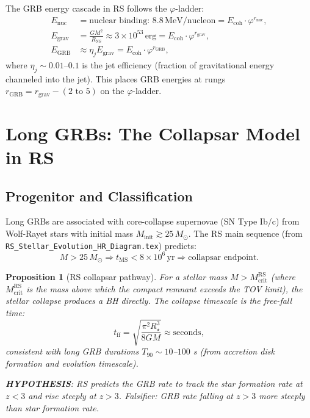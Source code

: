\documentclass[12pt,a4paper]{article}
\newtheorem{proposition}[theorem]{Proposition}
\theoremstyle{definition}
\theoremstyle{remark}
\begin{document}
The GRB energy cascade in RS follows the $\varphi$-ladder:
\begin{align}
  E_\mathrm{nuc} &= \text{nuclear binding: } 8.8\,\mathrm{MeV/nucleon} = E_\mathrm{coh} \cdot \varphi^{r_\mathrm{nuc}}, \\
  E_\mathrm{grav} &= \frac{GM^2}{R_\mathrm{NS}} \approx 3 \times 10^{53}\,\mathrm{erg} = E_\mathrm{coh} \cdot \varphi^{r_\mathrm{grav}}, \\
  E_\mathrm{GRB} &\approx \eta_j E_\mathrm{grav} = E_\mathrm{coh} \cdot \varphi^{r_\mathrm{GRB}},
\end{align}
where $\eta_j \sim 0.01$--$0.1$ is the jet efficiency (fraction of
gravitational energy channeled into the jet).  This places GRB energies
at rungs $r_\mathrm{GRB} = r_\mathrm{grav} - (2\text{ to }5)$ on the
$\varphi$-ladder.

\section{Long GRBs: The Collapsar Model in RS}
\label{sec:long}

\subsection{Progenitor and Classification}

Long GRBs are associated with core-collapse supernovae (SN Type Ib/c)
from Wolf-Rayet stars with initial mass $M_\mathrm{init} \gtrsim 25\,
M_\odot$.  The RS main sequence (from
\texttt{RS\_Stellar\_Evolution\_HR\_Diagram.tex}) predicts:
\begin{equation}
  M > 25\,M_\odot \Rightarrow t_\mathrm{MS} < 8 \times 10^6\,\mathrm{yr}
  \Rightarrow \text{collapsar endpoint}.
\end{equation}

\begin{proposition}[RS collapsar pathway]\label{prop:collapsar}
For a stellar mass $M > M_\mathrm{crit}^\mathrm{RS}$ (where
$M_\mathrm{crit}^\mathrm{RS}$ is the mass above which the compact
remnant exceeds the TOV limit), the stellar collapse produces a BH
directly.  The collapse timescale is the free-fall time:
\begin{equation}
  t_\mathrm{ff} = \sqrt{\frac{\pi^2 R_\star^3}{8GM}} \approx \text{seconds},
\end{equation}
consistent with long GRB durations $T_{90} \sim 10$--$100$ s (from
accretion disk formation and evolution timescale).

\textbf{HYPOTHESIS}: RS predicts the GRB rate to track the star
formation rate at $z < 3$ and rise steeply at $z > 3$.
Falsifier: GRB rate falling at $z > 3$ more steeply than star
formation rate.
\end{proposition}
\end{document}
